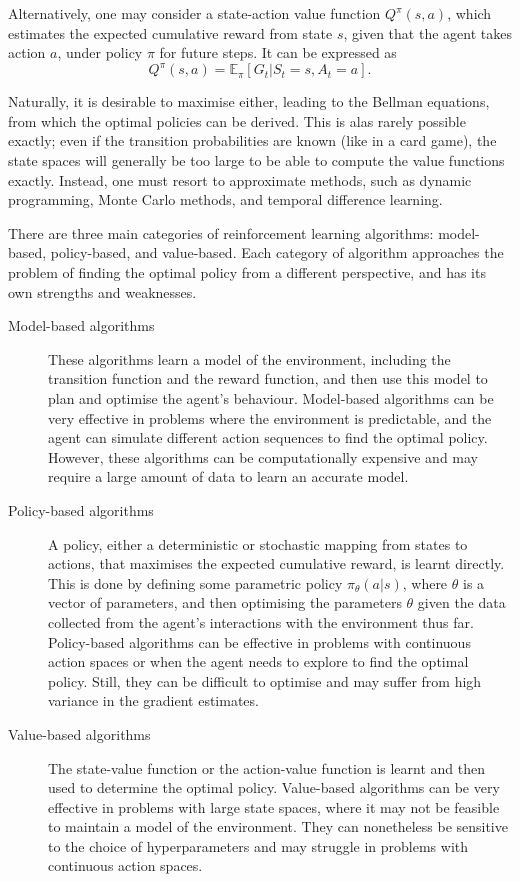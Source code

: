 Alternatively, one may consider a state-action value function $Q^{\pi}(s, a)$, which estimates the expected cumulative reward from state $s$, given that the agent takes action $a$, under policy $\pi$ for future steps.
It can be expressed as
\begin{equation}
    Q^{\pi}(s, a) = \mathbb{E}_\pi \left[ G_t | S_t = s, A_t = a \right].
\end{equation}

Naturally, it is desirable to maximise either, leading to the Bellman equations, from which the optimal policies can be derived.
This is alas rarely possible exactly; even if the transition probabilities are known (like in a card game), the state spaces will generally be too large to be able to compute the value functions exactly.
Instead, one must resort to approximate methods, such as dynamic programming, Monte Carlo methods, and temporal difference learning.

There are three main categories of reinforcement learning algorithms: model-based, policy-based, and value-based. Each category of algorithm approaches the problem of finding the optimal policy from a different perspective, and has its own strengths and weaknesses.

\begin{description}
    \item[Model-based algorithms]
        These algorithms learn a model of the environment, including the transition function and the reward function, and then use this model to plan and optimise the agent's behaviour.
        Model-based algorithms can be very effective in problems where the environment is predictable, and the agent can simulate different action sequences to find the optimal policy.
        However, these algorithms can be computationally expensive and may require a large amount of data to learn an accurate model.

    \item[Policy-based algorithms]
        A policy, either a deterministic or stochastic mapping from states to actions, that maximises the expected cumulative reward, is learnt directly.
        This is done by defining some parametric policy $\pi_\theta(a | s)$, where $\theta$ is a vector of parameters, and then optimising the parameters $\theta$ given the data collected from the agent's interactions with the environment thus far.
        Policy-based algorithms can be effective in problems with continuous action spaces or when the agent needs to explore to find the optimal policy.
        Still, they can be difficult to optimise and may suffer from high variance in the gradient estimates.

    \item[Value-based algorithms]
        The state-value function or the action-value function is learnt and then used  to determine the optimal policy.
        Value-based algorithms can be very effective in problems with large state spaces, where it may not be feasible to maintain a model of the environment.
        They can nonetheless be sensitive to the choice of hyperparameters and may struggle in problems with continuous action spaces.
\end{description}

